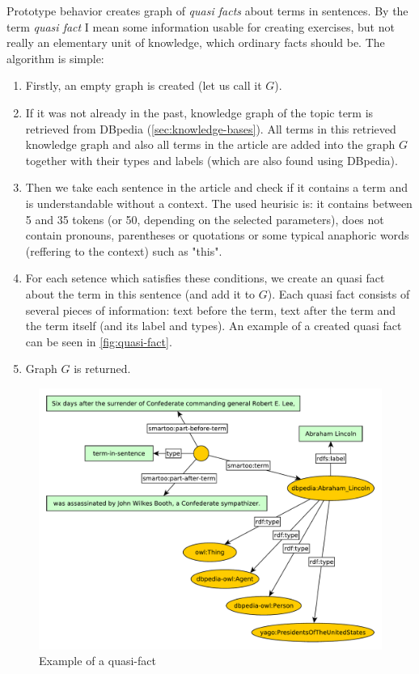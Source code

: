 \documentclass[a4paper, 12pt, twoside]{fithesis2}		%
\renewcommand{\_}{\leavevmode \kern0.0em\vbox{\hrule width0.4em}}
\newenvironment{myEnumerate}{
  \begin{enumerate}[leftmargin=2em,rightmargin=1em,itemsep=\parskip ,parsep=0em,topsep=0em,partopsep=0em]
}{
  \end{enumerate}
}
\begin{document}

Prototype behavior creates graph of \textit{quasi facts} about terms in sentences.
By the term \textit{quasi fact} I mean some information usable for creating exercises, but not really an elementary unit of knowledge, which ordinary facts should be. The algorithm is simple:
\begin{myEnumerate}
  \item Firstly, an empty graph is created (let us call it $G$).
  \item If it was not already in the past, knowledge graph of the topic term is retrieved from DBpedia (\autoref{sec:knowledge-bases}). All terms in this retrieved knowledge graph and also all terms in the article are added into the graph $G$ together with their types and labels (which are also found using DBpedia).
  \item Then we take each sentence in the article and check if it contains a term and is understandable without a context. The used heurisic is: it contains between 5 and 35 tokens (or 50, depending on the selected parameters), does not contain pronouns, parentheses or quotations or some typical anaphoric words (reffering to the context) such as "this".
  \item For each setence which satisfies these conditions, we create an quasi fact about the term in this sentence (and add it to $G$). Each quasi fact consists of several pieces of information: text before the term, text after the term and the term itself (and its label and types). An example of a created quasi fact can be seen in \autoref{fig:quasi-fact}.
  \item Graph $G$ is returned.
\end{myEnumerate}


\begin{figure}[h]
  \centering
  \includegraphics[width=\textwidth]{images/quasi-fact-lincoln.pdf}
  \caption{Example of a quasi-fact}
  \label{fig:quasi-fact}
\end{figure}
\end{document}
